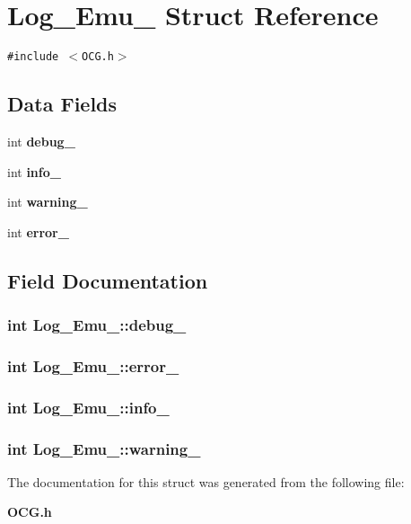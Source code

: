 \section{Log\_\-Emu\_\- Struct Reference}
\label{structLog__Emu__}
{\tt \#include $<$OCG.h$>$}

\subsection*{Data Fields}
\begin{CompactItemize}
\item 
int {\bf debug\_\-}
\item 
int {\bf info\_\-}
\item 
int {\bf warning\_\-}
\item 
int {\bf error\_\-}
\end{CompactItemize}


\subsection{Field Documentation}
\subsubsection[{debug\_\-}]{\setlength{\rightskip}{0pt plus 5cm}int {\bf Log\_\-Emu\_\-::debug\_\-}}\label{structLog__Emu___87bf6e14a3e2a6716e2d1f1f7af18f41}


\subsubsection[{error\_\-}]{\setlength{\rightskip}{0pt plus 5cm}int {\bf Log\_\-Emu\_\-::error\_\-}}\label{structLog__Emu___e8c5661110c02a5b91f69ff9ecd5277d}


\subsubsection[{info\_\-}]{\setlength{\rightskip}{0pt plus 5cm}int {\bf Log\_\-Emu\_\-::info\_\-}}\label{structLog__Emu___7922f62cef70b0949aee3841f31f40b3}


\subsubsection[{warning\_\-}]{\setlength{\rightskip}{0pt plus 5cm}int {\bf Log\_\-Emu\_\-::warning\_\-}}\label{structLog__Emu___a480738389af25259a489e0e4352aea5}




The documentation for this struct was generated from the following file:\begin{CompactItemize}
\item 
{\bf OCG.h}\end{CompactItemize}
